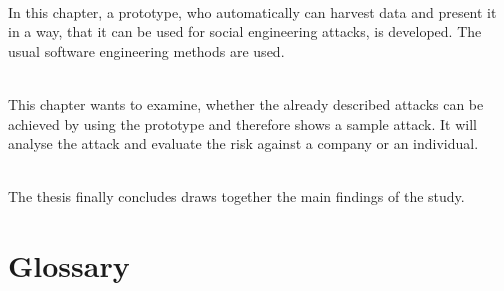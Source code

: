\vspace{0.5em}\\
\noindent In this chapter, a prototype, who automatically can harvest data and
present it in a way, that it can be used for social engineering attacks, is
developed. The usual software engineering methods are used.

\vspace{0.5em}\\
\noindent This chapter wants to examine, whether the already described attacks
can be achieved by using the prototype and therefore shows a sample attack. It
will analyse the attack and evaluate the risk against a company or an
individual.

\vspace{0.5em}\\
\noindent The thesis finally concludes draws together the main findings of the
study.

\section{Glossary}
